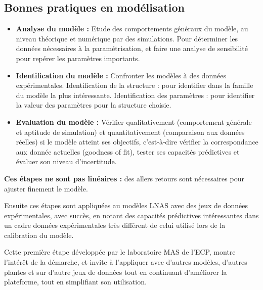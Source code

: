 \subsection{Bonnes pratiques en modélisation}

\begin{itemize}

\item \textbf{Analyse du modèle :} Etude des comportements généraux du modèle, au niveau théorique et numérique par des simulations. Pour déterminer les données nécessaires à la paramétrisation, et faire une analyse de sensibilité pour repérer les paramètres importants.
\item \textbf{Identification du modèle :} Confronter les modèles à des données expérimentales. Identification de la structure : pour identifier dans la famille du modèle la plus intéressante. Identification des paramètres : pour identifier la valeur des paramètres pour la structure choisie.
\item \textbf{Evaluation du modèle :} Vérifier qualitativement (comportement générale et aptitude de simulation) et quantitativement (comparaison aux données réelles) si le modèle atteint ses objectifs, c’est-à-dire vérifier la correspondance aux donnée actuelles (goodness of fit), tester ses capacités prédictives et évaluer son niveau d’incertitude.

\end{itemize}

\textbf{Ces étapes ne sont pas linéaires :} des allers retours sont nécessaires pour ajuster finement le modèle.

Ensuite ces étapes sont appliquées au modèles LNAS avec des jeux de données expérimentales, avec succès, en notant des capacités prédictives intéressantes dans un cadre données expérimentales très différent de celui utilisé lors de la calibration du modèle.

Cette première étape développée par le laboratoire MAS de l’ECP, montre l’intérêt de la démarche, et invite à l’appliquer avec d’autres modèles, d’autres plantes et sur d’autre jeux de données tout en continuant d’améliorer la plateforme, tout en simplifiant son utilisation.
